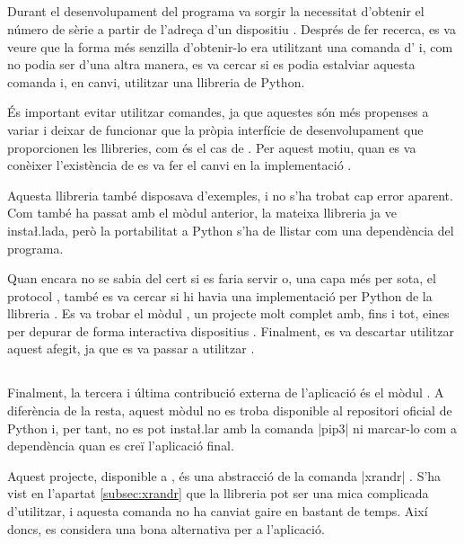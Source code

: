 \subsection{}

Durant el desenvolupament del programa va sorgir la necessitat d'obtenir el
número de sèrie a partir de l'adreça d'un dispositiu . Després de fer
recerca, es va veure que la forma més senzilla d'obtenir-lo era utilitzant una
comanda d' i, com no podia ser d'una altra manera, es va cercar si es
podia estalviar aquesta comanda i, en canvi, utilitzar una llibreria de Python.

És important evitar utilitzar comandes, ja que aquestes són més propenses a
variar i deixar de funcionar que la pròpia interfície de desenvolupament que
proporcionen les llibreries, com és el cas de . Per aquest motiu,
quan es va conèixer l'existència de  es va fer el canvi en la
implementació \cite{Pyudev}.

Aquesta llibreria també disposava d'exemples, i no s'ha trobat cap
error aparent. Com també ha passat amb el mòdul anterior, la mateixa llibreria
ja ve insta\l.lada, però la portabilitat a Python s'ha de llistar com una
dependència del programa.

Quan encara no se sabia del cert si es faria servir  o, una capa
més per sota, el protocol , també es va cercar si hi havia una
implementació per Python de la llibreria . Es va trobar el mòdul
, un projecte molt complet amb, fins i tot, eines per
depurar de forma interactiva dispositius  \cite{CpythonHid}.
Finalment, es va descartar utilitzar aquest afegit, ja que es va passar a
utilitzar .

\subsection{}
\label{subsec:pyrandr}

Finalment, la tercera i última contribució externa de l'aplicació és el
mòdul . A diferència de la resta, aquest mòdul no es troba
disponible al repositori oficial de Python  i, per tant, no es pot
insta\l.lar amb la comanda \ord|pip3| ni marcar-lo com a dependència quan es creï
l'aplicació final.

Aquest projecte, disponible a , és una abstracció de la comanda
\ord|xrandr| \cite{Pyrandr}. S'ha vist en l'apartat \ref{subsec:xrandr} que la
llibreria
 pot ser una mica complicada d'utilitzar, i aquesta comanda no ha
canviat gaire en bastant de temps. Així doncs, es considera una bona alternativa
per a l'aplicació.


